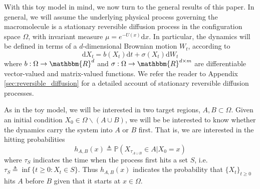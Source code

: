 \documentclass[english, aip, jcp, priprint, graphicx,floatfix]{revtex4-1}
\theoremstyle{plain}
\theoremstyle{definition}
\theoremstyle{plain}
\begin{document}
With this toy model in mind, we now turn to the general results of this paper. In general, we will assume the underlying physical process governing the macromolecule is a stationary reversible diffusion process in the configuration space $\Omega$, with invariant
measure ${\mu}= e^{- U (x)} \mathrm{d} x$.  In particular, the dynamics will be defined in terms of a $d$-dimensional Brownian motion $W_t$, according to 
\begin{equation}\label{equ:general_sde}\mathrm{d} X_t = b (X_t) \mathrm{d} t + \sigma (X_t) \mathrm{d} W_t \end{equation}
where $b: \Omega \rightarrow \mathbbm{R}^d$ and $\sigma :
\Omega \rightarrow \mathbbm{R}^{d \times m}$ are differentiable vector-valued
and matrix-valued functions.  We refer the reader to Appendix \ref{sec:reversible_diffusion} for a detailed account of stationary reversible diffusion processes.

As in the toy model, we will be interested in two target regions, $A,B\subset \Omega$.  Given an initial condition $X_0\in \Omega \backslash (A\cup B)$, we will be be interested to know whether the dynamics carry the system into $A$ or $B$ first.  That is, we are interested in the hitting probabilities
\[ h_{A, B}(x) \triangleq \mathbb{P}(X_{\tau_{A\cup B}}\in A|X_0=x)\]
where $\tau_S$ indicates the time when the process first hits a set $S$, i.e. $\tau_S \triangleq \inf \{ t \geqslant 0 : X_t \in S \}$.  Thus $h_{A,B}(x)$ indicates the probability that $\{X_t\}_{t \geq 0}$ hits $A$ before $B$ given that it starts at $x\in\Omega$. 
\end{document}

